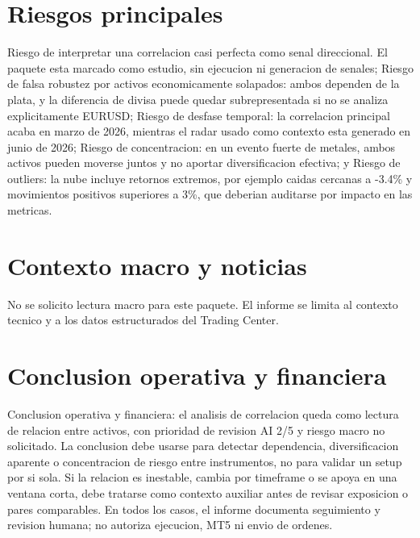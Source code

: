 \documentclass[11pt,a4paper]{article}
\begin{document}
\section*{Riesgos principales}
Riesgo de interpretar una correlacion casi perfecta como senal direccional. El paquete esta marcado como estudio, sin ejecucion ni generacion de senales; Riesgo de falsa robustez por activos economicamente solapados: ambos dependen de la plata, y la diferencia de divisa puede quedar subrepresentada si no se analiza explicitamente EURUSD; Riesgo de desfase temporal: la correlacion principal acaba en marzo de 2026, mientras el radar usado como contexto esta generado en junio de 2026; Riesgo de concentracion: en un evento fuerte de metales, ambos activos pueden moverse juntos y no aportar diversificacion efectiva; y Riesgo de outliers: la nube incluye retornos extremos, por ejemplo caidas cercanas a -3.4\% y movimientos positivos superiores a 3\%, que deberian auditarse por impacto en las metricas.

\section*{Contexto macro y noticias}
No se solicito lectura macro para este paquete. El informe se limita al contexto tecnico y a los datos estructurados del Trading Center.

\section*{Conclusion operativa y financiera}
Conclusion operativa y financiera: el analisis de correlacion queda como lectura de relacion entre activos, con prioridad de revision AI 2/5 y riesgo macro no solicitado. La conclusion debe usarse para detectar dependencia, diversificacion aparente o concentracion de riesgo entre instrumentos, no para validar un setup por si sola. Si la relacion es inestable, cambia por timeframe o se apoya en una ventana corta, debe tratarse como contexto auxiliar antes de revisar exposicion o pares comparables. En todos los casos, el informe documenta seguimiento y revision humana; no autoriza ejecucion, MT5 ni envio de ordenes.
\end{document}
